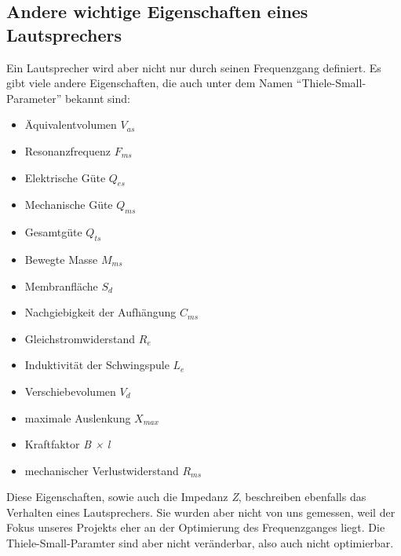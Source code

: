 \subsection{Andere wichtige Eigenschaften eines Lautsprechers}\label{subsec:5.1.1}
Ein Lautsprecher wird aber nicht nur durch seinen Frequenzgang definiert. Es gibt viele andere Eigenschaften, die auch unter dem Namen \enquote{Thiele-Small-Parameter} bekannt sind:
\begin{itemize}
	\item Äquivalentvolumen $ V_{as} $
	\item Resonanzfrequenz $ F_{ms} $
	\item Elektrische Güte $ Q_{es} $
	\item Mechanische Güte $ Q_{ms} $
	\item Gesamtgüte $ Q_{ts} $
	\item Bewegte Masse $ M_{ms} $
	\item Membranfläche $ S_{d} $
	\item Nachgiebigkeit der Aufhängung $ C_{ms} $
	\item Gleichstromwiderstand $ R_{e} $
	\item Induktivität der Schwingspule $ L_{e} $
	\item Verschiebevolumen $ V_{d} $
	\item maximale Auslenkung $ X_{max} $
	\item Kraftfaktor \emph{B × l}
	\item mechanischer Verlustwiderstand $ R_{ms} $
\end{itemize}
Diese Eigenschaften, sowie auch die Impedanz \emph{Z}, beschreiben ebenfalls das Verhalten eines Lautsprechers. Sie wurden aber nicht von uns gemessen, weil der Fokus unseres Projekts eher an der Optimierung des Frequenzganges liegt. Die Thiele-Small-Paramter sind aber nicht veränderbar, also auch nicht optimierbar.

